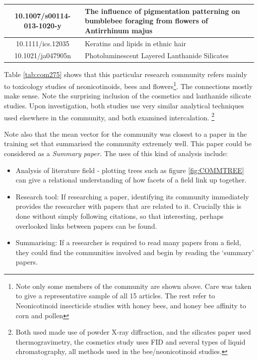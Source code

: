 \begin{table}[H]
\begin{tabular}{||c|X||}
10.1007/s00114-013-1020-y        & \footnotesize{The influence of pigmentation patterning on bumblebee foraging from flowers of Antirrhinum majus                                                                  } \\ \hline
10.1111/ics.12035                & \footnotesize{ Keratins and lipids in ethnic hair                                                                                                                                } \\ \hline
10.1021/ja047905n                & \footnotesize{Photoluminescent Layered Lanthanide Silicates                                                                                                                     } \\ \hline
\end{tabular}
\end{table}

Table \ref{tab:com275} shows that this particular research community refers mainly to toxicology studies of neonicotinoids,  bees and flowers\footnote{Note only some members of the community are shown above. Care was taken to give a representative sample of all 15 articles. The rest refer to Neonicotinoid insecticide studies with honey bees, and honey bee affinity to corn and pollen}. The connections mostly make sense. Note the surprising inclusion of the cosmetics and lanthanide silicate studies. Upon investigation, both studies use very similar analytical techniques used elsewhere in the community, and both examined intercalation.
\footnote{Both used made use of powder X-ray diffraction, and the silicates paper used thermogravimetry, the cosmetics study uses FID and several types of liquid chromatography, all methods used in the bee/neonicotinoid studies.}

Note also that the mean vector for the community was closest to a paper in the training set that summarised the community extremely well. This paper could be considered as a \emph{Summary paper.}
The uses of this kind of analysis include:
\begin{itemize}
\item Analysis of literature field - plotting trees such as figure \ref{fig:COMMTREE} can give a relational understanding of how facets of a field link up together. 
\item Research tool: If researching a paper, identifying its community immediately provides the researcher with papers that are related to it. Crucially this is done without simply following citations, so that interesting, perhaps overlooked links between papers can be found.
\item Summarising: If a researcher is required to read many papers from a field, they could find the communities involved and begin by reading the `summary' papers. 
\end{itemize}

